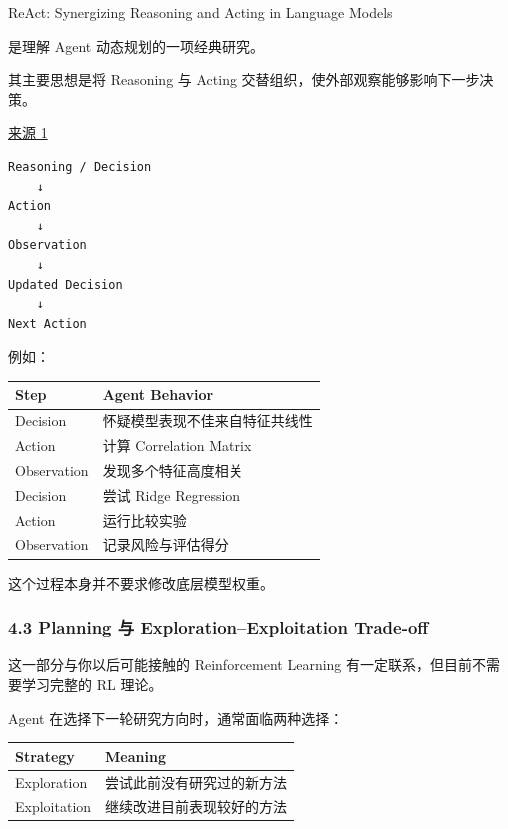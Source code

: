 ReAct: Synergizing Reasoning and Acting in Language Models

是理解 Agent 动态规划的一项经典研究。

其主要思想是将 Reasoning 与 Acting 交替组织，使外部观察能够影响下一步决策。

\href{https://arxiv.org/abs/2210.03629}{来源 1}

\begin{verbatim}
Reasoning / Decision
    ↓
Action
    ↓
Observation
    ↓
Updated Decision
    ↓
Next Action
\end{verbatim}

例如：

\begin{readertable}
\begin{longtable}[]{@{}
  >{\raggedright\arraybackslash}p{}
  >{\raggedright\arraybackslash}p{}@{}}
\toprule
Step & Agent Behavior \\
\midrule
\endhead
Decision & 怀疑模型表现不佳来自特征共线性 \\
Action & 计算 Correlation Matrix \\
Observation & 发现多个特征高度相关 \\
Decision & 尝试 Ridge Regression \\
Action & 运行比较实验 \\
Observation & 记录风险与评估得分 \\
\bottomrule
\end{longtable}
\end{readertable}

这个过程本身并不要求修改底层模型权重。

\hypertarget{part-3-34-0001-planning-ux4e0e-explorationexploitation-trade-off}{%
\subsubsection{4.3 Planning 与 Exploration--Exploitation Trade-off}\label{part-3-34-0001-planning-ux4e0e-explorationexploitation-trade-off}}

这一部分与你以后可能接触的 Reinforcement Learning 有一定联系，但目前不需要学习完整的 RL 理论。

Agent 在选择下一轮研究方向时，通常面临两种选择：

\begin{readertable}
\begin{longtable}[]{@{}
  >{\raggedright\arraybackslash}p{}
  >{\raggedright\arraybackslash}p{}@{}}
\toprule
Strategy & Meaning \\
\midrule
\endhead
Exploration & 尝试此前没有研究过的新方法 \\
Exploitation & 继续改进目前表现较好的方法 \\
\bottomrule
\end{longtable}
\end{readertable}

